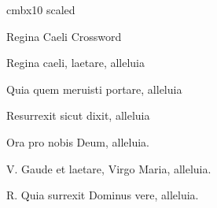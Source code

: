 

\font\huge cmbx10 scaled 

\centerline{{\huge Regina Caeli Crossword}}

\bigskip

\centerline{Regina caeli, laetare, alleluia}

\centerline{Quia quem meruisti portare, alleluia}

\centerline{Resurrexit sicut dixit, alleluia}

\centerline{Ora pro nobis Deum, alleluia.}

\hskip 5.6cm V. Gaude et laetare, Virgo Maria, alleluia.

\hskip 5.6cm R. Quia surrexit Dominus vere, alleluia.

\vbox{\offinterlineskip\hbox{ \emp  \emp  \emp  \emp  \emp  \emp  \emp  \emp  \emp  \emp  \emp  \emp  \emp  \emp  \emp  \emp  \emp  \emp  \emp  \emp  \emp  \emp  {}\emp  }
\hbox{ \emp  \emp  \emp  \emp  \emp  \emp  \emp  \emp  \emp  \emp  \emp  \emp  \emp  \emp  \emp  \emp  \emp  \emp  \emp  \emp  \emp  \emp  \bx{ }\emp  }
\hbox{ \emp  \emp  \emp  \emp  \emp  \emp  \emp  \emp  \emp  \emp  \emp  \emp  \emp  \emp  \emp  \emp  {}\bx{ }\bx{ }\bx{ }\bx{ }\bx{ }\bx{ }\bx{ }}
\hbox{ \emp  \emp  \emp  {}\bx{ }\bx{ }\bx{ }\bx{ }\bx{ }\bx{ }\bx{ }\bx{ }\emp  \emp  \emp  \bx{ }\emp  \emp  \emp  \emp  \emp  \bx{ }\emp  }
\hbox{ \emp  \emp  \emp  \emp  \emp  \emp  \bx{ }\emp  \emp  \emp  \emp  \emp  \emp  {}\emp  \emp  \bx{ }\emp  \emp  \emp  \emp  \emp  \bx{ }\emp  }
\hbox{ \emp  \emp  \emp  \emp  \emp  {}\bx{ }\bx{ }\bx{ }\bx{ }\bx{ }\bx{ }\bx{ }\bx{ }\bx{ }\bx{ }\bx{ }\bx{ }\bx{ }\bx{ }\bx{ }\bx{ }\bx{ }\bx{ }}
\hbox{ \emp  \emp  \emp  \emp  \emp  \emp  \bx{ }\emp  \emp  \emp  \emp  \emp  \emp  \bx{ }\emp  \emp  \bx{ }\emp  \emp  \emp  \emp  \emp  \bx{ }\emp  }
\hbox{ \emp  \emp  \emp  \emp  \emp  \emp  \bx{ }\emp  \emp  \emp  \emp  \emp  \emp  \bx{ }\emp  \emp  \bx{ }\emp  \emp  \emp  \emp  \emp  \bx{ }\emp  }
\hbox{ \emp  \emp  \emp  \emp  \emp  {}\bx{ }\bx{ }\bx{ }\bx{ }\bx{ }\bx{ }\bx{ }\bx{ }\emp  \bx{ }\emp  \emp  \emp  \emp  \emp  \emp  \emp  }
\hbox{ \emp  \emp  \emp  \emp  \emp  \emp  \bx{ }\emp  \emp  \bx{ }\emp  \emp  \emp  \bx{ }\emp  \emp  \emp  \emp  \emp  \emp  \emp  \emp  \emp  \emp  }
\hbox{ \emp  \emp  \emp  \emp  \emp  \emp  \bx{ }\emp  \emp  \bx{ }\emp  \emp  \emp  \bx{ }\emp  \emp  \emp  \emp  \emp  \emp  \emp  \emp  \emp  \emp  }
\hbox{ \emp  \emp  \emp  \emp  \emp  {}\bx{ }\bx{ }\bx{ }\bx{ }\emp  \emp  \emp  \bx{ }\emp  \emp  \emp  \emp  \emp  \emp  \emp  \emp  \emp  \emp  }
}
